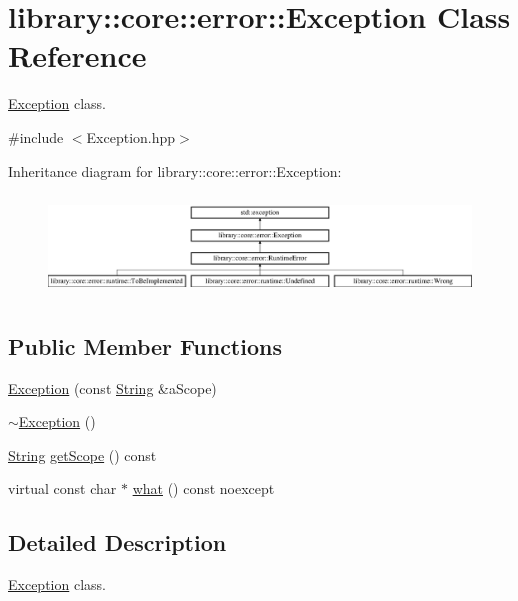 \hypertarget{classlibrary_1_1core_1_1error_1_1_exception}{}\section{library\+::core\+::error\+::Exception Class Reference}
\label{classlibrary_1_1core_1_1error_1_1_exception}


\mbox{\hyperlink{classlibrary_1_1core_1_1error_1_1_exception}{Exception}} class.  




{\ttfamily \#include $<$Exception.\+hpp$>$}

Inheritance diagram for library\+::core\+::error\+::Exception\+:\begin{figure}[H]
\begin{center}
\leavevmode
\includegraphics[height=2.715152cm]{classlibrary_1_1core_1_1error_1_1_exception}
\end{center}
\end{figure}
\subsection*{Public Member Functions}
\begin{DoxyCompactItemize}
\item 
\mbox{\hyperlink{classlibrary_1_1core_1_1error_1_1_exception_a8e0c32779ff9a01d992d810848c841b7}{Exception}} (const \mbox{\hyperlink{classlibrary_1_1core_1_1types_1_1_string}{String}} \&a\+Scope)
\item 
\mbox{\hyperlink{classlibrary_1_1core_1_1error_1_1_exception_a2fc342415e921c6037465806d278d7d0}{$\sim$\+Exception}} ()
\item 
\mbox{\hyperlink{classlibrary_1_1core_1_1types_1_1_string}{String}} \mbox{\hyperlink{classlibrary_1_1core_1_1error_1_1_exception_a9c20da352aa0785b837b43cd52d09500}{get\+Scope}} () const
\item 
virtual const char $\ast$ \mbox{\hyperlink{classlibrary_1_1core_1_1error_1_1_exception_ab318a927162519b15961ca66be07fd6b}{what}} () const noexcept
\end{DoxyCompactItemize}


\subsection{Detailed Description}
\mbox{\hyperlink{classlibrary_1_1core_1_1error_1_1_exception}{Exception}} class. 

